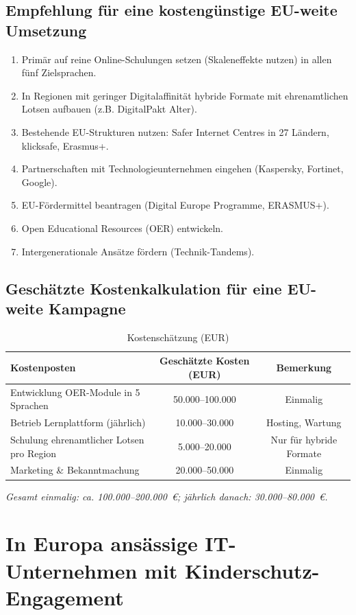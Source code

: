 \documentclass[11pt,a4paper]{article}
\begin{document}
	\subsection{Empfehlung für eine kostengünstige EU-weite Umsetzung}
	\begin{enumerate}
		\item Primär auf reine Online-Schulungen setzen (Skaleneffekte nutzen) in allen fünf Zielsprachen.
		\item In Regionen mit geringer Digitalaffinität hybride Formate mit ehrenamtlichen Lotsen aufbauen (z.B. DigitalPakt Alter).
		\item Bestehende EU-Strukturen nutzen: Safer Internet Centres in 27 Ländern, klicksafe, Erasmus+.
		\item Partnerschaften mit Technologieunternehmen eingehen (Kaspersky, Fortinet, Google).
		\item EU-Fördermittel beantragen (Digital Europe Programme, ERASMUS+).
		\item Open Educational Resources (OER) entwickeln.
		\item Intergenerationale Ansätze fördern (Technik-Tandems).
	\end{enumerate}
	
	\subsection{Geschätzte Kostenkalkulation für eine EU-weite Kampagne}
	\begin{table}[ht]
		\centering
		\caption{Kostenschätzung (EUR)}
		\begin{tabular}{@{}lcc@{}}
			\toprule
			Kostenposten & Geschätzte Kosten (EUR) & Bemerkung \\
			\midrule
			Entwicklung OER-Module in 5 Sprachen & 50.000--100.000 & Einmalig \\
			Betrieb Lernplattform (jährlich) & 10.000--30.000 & Hosting, Wartung \\
			Schulung ehrenamtlicher Lotsen pro Region & 5.000--20.000 & Nur für hybride Formate \\
			Marketing \& Bekanntmachung & 20.000--50.000 & Einmalig \\
			\bottomrule
		\end{tabular}
	\end{table}
	\textit{Gesamt einmalig: ca. 100.000--200.000~€; jährlich danach: 30.000--80.000~€.}
	
	\section{In Europa ansässige IT-Unternehmen mit Kinderschutz-Engagement}
	
\end{document}
